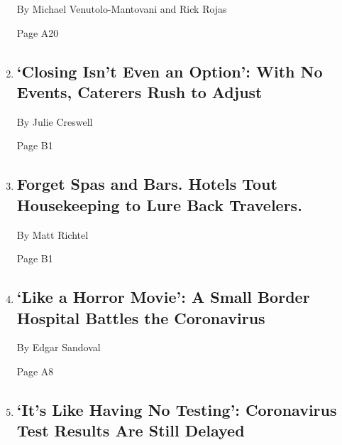 \begin{enumerate}
  By Michael Venutolo-Mantovani and Rick Rojas

  Page A20
\item
  \href{/2020/08/04/business/coronavirus-struggling-caterers.html}{}

  \hypertarget{closing-isnt-even-an-option-with-no-events-caterers-rush-to-adjust}{%
  \subsection{`Closing Isn't Even an Option': With No Events, Caterers
  Rush to
  Adjust}\label{closing-isnt-even-an-option-with-no-events-caterers-rush-to-adjust}}

  By Julie Creswell

  Page B1
\item
  \href{/2020/08/04/health/coronavirus-hotels-infect.html}{}

  \hypertarget{forget-spas-and-bars-hotels-tout-housekeeping-to-lure-back-travelers}{%
  \subsection{Forget Spas and Bars. Hotels Tout Housekeeping to Lure
  Back
  Travelers.}\label{forget-spas-and-bars-hotels-tout-housekeeping-to-lure-back-travelers}}

  By Matt Richtel

  Page B1
\item
  \href{/2020/08/04/us/texas-coronavirus-rio-grande-valley-starr-county.html}{}

  \hypertarget{like-a-horror-movie-a-small-border-hospital-battles-the-coronavirus}{%
  \subsection{`Like a Horror Movie': A Small Border Hospital Battles the
  Coronavirus}\label{like-a-horror-movie-a-small-border-hospital-battles-the-coronavirus}}

  By Edgar Sandoval

  Page A8
\item
  \href{/2020/08/04/us/virus-testing-delays.html}{}

  \hypertarget{its-like-having-no-testing-coronavirus-test-results-are-still-delayed}{%
  \subsection{`It's Like Having No Testing': Coronavirus Test Results
  Are Still
  Delayed}\label{its-like-having-no-testing-coronavirus-test-results-are-still-delayed}}


\end{enumerate}
